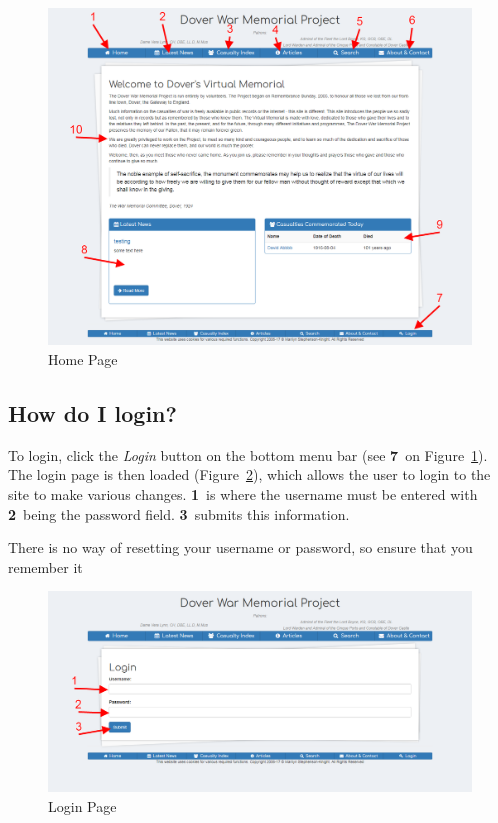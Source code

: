 \documentclass[12pt]{article}
\newcommand{\marker}[1]{\color{red}\textbf{#1}\color{black}}
\begin{document}
\begin{figure}[h]
  \centering
 \includegraphics[width=.9\textwidth]{pics/home.png}
	\caption{Home Page}\label{fig:home}
\end{figure}

\newpage
\FloatBarrier
\subsection{How do I login?}\label{ssec:login}
To login, click the \textit{Login} button on the bottom menu bar (see \marker{7}\ on Figure~\ref{fig:home}). The login page is then loaded (Figure~\ref{fig:login}), which allows the user to login to the site to make various changes. \marker{1}\ is where the username must be entered with \marker{2}\ being the password field. \marker{3}\ submits this information.

\begin{warningBox}
There is no way of resetting your username or password, so ensure that you remember it
\end{warningBox}

\begin{figure}[h]
  \centering
 \includegraphics[width=.9\textwidth]{pics/login.png}
	\caption{Login Page}\label{fig:login}
\end{figure}
\end{document}
